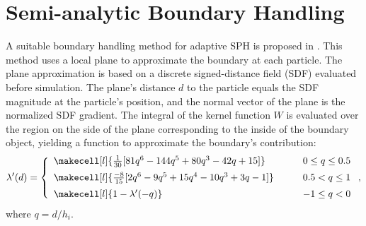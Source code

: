 \documentclass[VANCOUVER,STIX1COL]{WileyNJD-v2}
\begin{document}
\section{Semi-analytic Boundary Handling}
\label{sec:boundary}

A suitable boundary handling method for adaptive SPH is proposed in \cite{Winchenbach20}. This method uses a local plane to approximate the boundary at each particle. The plane approximation is based on a discrete signed-distance field (SDF) evaluated before simulation. The plane's distance $d$ to the particle equals the SDF magnitude at the particle's position, and the normal vector of the plane is the normalized SDF gradient. The integral of the kernel function $W$ is evaluated over the region on the side of the plane corresponding to the inside of the boundary object, yielding a function to approximate the boundary's contribution:
\begin{equation}
    \lambda'(d) = \left\{
    \begin{array}{ll}
        \vspace{5pt}
        \makecell[l]{\frac{1}{30}[81q^6 - 144q^5+ 80q^3 -42q + 15]} & \hspace{2em} 0 \leq q \leq 0.5\\
        \vspace{5pt}
        \makecell[l]{\frac{-8}{15}[2q^6 - 9q^5 + 15q^4 - 10q^3 + 3q - 1]} & \hspace{2em} 0.5 < q \leq 1 \\
        \makecell[l]{1-\lambda'(-q)} & \hspace{2em} -1 \leq q < 0 
    \end{array}
    \right.,
\end{equation}
where $q = d / h_i$.
\end{document}
